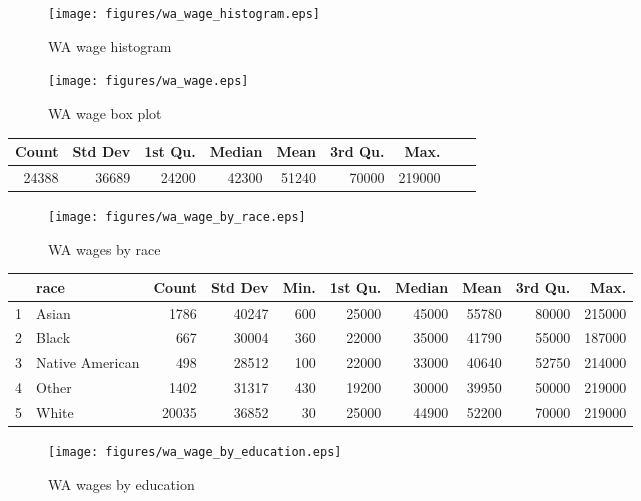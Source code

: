 \documentclass{exam}
\begin{document}
  \begin{figure}[H]
    \centering
    \texttt{[image: figures/wa\_wage\_histogram.eps]}
    \caption{WA wage histogram}
  \end{figure}

  \begin{figure}[H]
    \centering
    \texttt{[image: figures/wa\_wage.eps]}
    \caption{WA wage box plot}
  \end{figure}

  \begin{table}[ht]
    \centering
    \begin{tabular}{rrrrrrrrr}
      \toprule
        Count & Std Dev & 1st Qu. & Median & Mean  & 3rd Qu. & Max. \\
      \midrule
        24388 & 36689   & 24200   & 42300  & 51240 & 70000   & 219000 \\
      \bottomrule
    \end{tabular}
  \end{table}

  \begin{figure}[H]
    \centering
    \texttt{[image: figures/wa\_wage\_by\_race.eps]}
    \caption{WA wages by race}
  \end{figure}

  \begin{table}[ht]
    \centering
    \begin{tabular}{rlrrrrrrrr}
      \toprule
          & race            & Count & Std Dev & Min. & 1st Qu. & Median & Mean  & 3rd Qu. & Max. \\
      \midrule
        1 & Asian           & 1786  & 40247   & 600  & 25000   & 45000  & 55780 & 80000   & 215000 \\
        2 & Black           & 667   & 30004   & 360  & 22000   & 35000  & 41790 & 55000   & 187000 \\
        3 & Native American & 498   & 28512   & 100  & 22000   & 33000  & 40640 & 52750   & 214000 \\
        4 & Other           & 1402  & 31317   & 430  & 19200   & 30000  & 39950 & 50000   & 219000 \\
        5 & White           & 20035 & 36852   & 30   & 25000   & 44900  & 52200 & 70000   & 219000 \\
      \bottomrule
    \end{tabular}
  \end{table}

  \begin{figure}[H]
    \centering
    \texttt{[image: figures/wa\_wage\_by\_education.eps]}
    \caption{WA wages by education}
  \end{figure}
\end{document}
